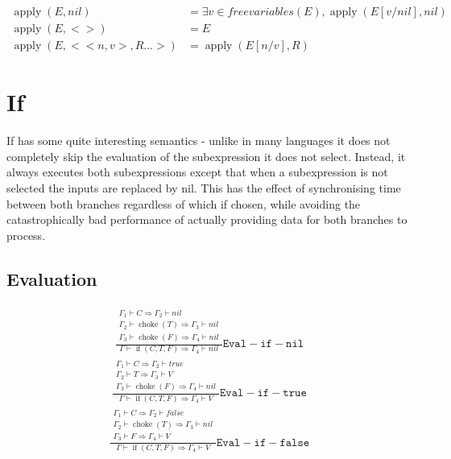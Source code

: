 \documentclass{scrartcl}
\DeclareMathOperator{\apply}{apply}
\DeclareMathOperator{\ifop}{if}
\DeclareMathOperator{\choke}{choke}
\begin{document}
    \begin{align*}
        \apply(E, nil) & = \exists v \in freevariables(E), \apply(E[v/nil], nil) \\
        \apply(E, <>) & = E \\
        \apply(E, <<n, v>, R...>) & = \apply(E[n/v], R)
    \end{align*}
    
    \section{If}
    
    If has some quite interesting semantics - unlike in many languages it does not completely skip
    the evaluation of the subexpression it does not select. Instead, it always executes both
    subexpressions except that when a subexpression is not selected the inputs are replaced
    by nil. This has the effect of synchronising time between both branches regardless of which
    if chosen, while avoiding the catastrophically bad performance of actually providing data
    for both branches to process.
    
    \subsection{Evaluation}
    
    \begin{align*}
    \frac{
        \begin{matrix}
        \Gamma_1 \vdash C \Rightarrow \Gamma_2 \vdash nil \\
        \Gamma_2 \vdash \choke(T) \Rightarrow \Gamma_3 \vdash nil \\
        \Gamma_3 \vdash \choke(F) \Rightarrow \Gamma_4 \vdash nil
        \end{matrix}
    }{
        \Gamma \vdash \ifop(C, T, F) \Rightarrow \Gamma_4 \vdash nil
    }\mathtt{Eval-if-nil}
    \end{align*}
    \begin{align*}
    \frac{
        \begin{matrix}
        \Gamma_1 \vdash C \Rightarrow \Gamma_2 \vdash true \\
        \Gamma_2 \vdash T \Rightarrow \Gamma_3 \vdash V \\
        \Gamma_3 \vdash \choke(F) \Rightarrow \Gamma_4 \vdash nil
        \end{matrix}
    }{
        \Gamma \vdash \ifop(C, T, F) \Rightarrow \Gamma_4 \vdash V
    }\mathtt{Eval-if-true}
    \end{align*}
    \begin{align*}
    \frac{
        \begin{matrix}
        \Gamma_1 \vdash C \Rightarrow \Gamma_2 \vdash false \\
        \Gamma_2 \vdash \choke(T) \Rightarrow \Gamma_3 \vdash nil \\
        \Gamma_3 \vdash F \Rightarrow \Gamma_4 \vdash V
        \end{matrix}
    }{
        \Gamma \vdash \ifop(C, T, F) \Rightarrow \Gamma_4 \vdash V
    }\mathtt{Eval-if-false}
    \end{align*}
    
\end{document}
